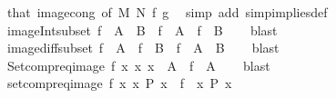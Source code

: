 \begin{isabellebody}
\ that\ image{\isacharunderscore}{\kern0pt}cong\ {\isacharbrackleft}{\kern0pt}of\ M\ N\ f\ g{\isacharbrackright}{\kern0pt}\ \isamarkupfalse%
\ {\isacharparenleft}{\kern0pt}simp\ add{\isacharcolon}{\kern0pt}\ simp{\isacharunderscore}{\kern0pt}implies{\isacharunderscore}{\kern0pt}def{\isacharparenright}{\kern0pt}%
\endisatagproof
{\isafoldproof}%
%
\isadelimproof
\isanewline
%
\endisadelimproof
\isanewline
{}\isamarkupfalse%
\ image{\isacharunderscore}{\kern0pt}Int{\isacharunderscore}{\kern0pt}subset{\isacharcolon}{\kern0pt}\ {\isachardoublequoteopen}f\ {\isacharbackquote}{\kern0pt}\ {\isacharparenleft}{\kern0pt}A\ {\isasyminter}\ B{\isacharparenright}{\kern0pt}\ {\isasymsubseteq}\ f\ {\isacharbackquote}{\kern0pt}\ A\ {\isasyminter}\ f\ {\isacharbackquote}{\kern0pt}\ B{\isachardoublequoteclose}\isanewline
%
\isadelimproof
\ \ %
\endisadelimproof
%
\isatagproof
{}\isamarkupfalse%
\ blast%
\endisatagproof
{\isafoldproof}%
%
\isadelimproof
\isanewline
%
\endisadelimproof
\isanewline
{}\isamarkupfalse%
\ image{\isacharunderscore}{\kern0pt}diff{\isacharunderscore}{\kern0pt}subset{\isacharcolon}{\kern0pt}\ {\isachardoublequoteopen}f\ {\isacharbackquote}{\kern0pt}\ A\ {\isacharminus}{\kern0pt}\ f\ {\isacharbackquote}{\kern0pt}\ B\ {\isasymsubseteq}\ f\ {\isacharbackquote}{\kern0pt}\ {\isacharparenleft}{\kern0pt}A\ {\isacharminus}{\kern0pt}\ B{\isacharparenright}{\kern0pt}{\isachardoublequoteclose}\isanewline
%
\isadelimproof
\ \ %
\endisadelimproof
%
\isatagproof
{}\isamarkupfalse%
\ blast%
\endisatagproof
{\isafoldproof}%
%
\isadelimproof
\isanewline
%
\endisadelimproof
\isanewline
{}\isamarkupfalse%
\ Setcompr{\isacharunderscore}{\kern0pt}eq{\isacharunderscore}{\kern0pt}image{\isacharcolon}{\kern0pt}\ {\isachardoublequoteopen}{\isacharbraceleft}{\kern0pt}f\ x\ {\isacharbar}{\kern0pt}x{\isachardot}{\kern0pt}\ x\ {\isasymin}\ A{\isacharbraceright}{\kern0pt}\ {\isacharequal}{\kern0pt}\ f\ {\isacharbackquote}{\kern0pt}\ A{\isachardoublequoteclose}\isanewline
%
\isadelimproof
\ \ %
\endisadelimproof
%
\isatagproof
{}\isamarkupfalse%
\ blast%
\endisatagproof
{\isafoldproof}%
%
\isadelimproof
\isanewline
%
\endisadelimproof
\isanewline
{}\isamarkupfalse%
\ setcompr{\isacharunderscore}{\kern0pt}eq{\isacharunderscore}{\kern0pt}image{\isacharcolon}{\kern0pt}\ {\isachardoublequoteopen}{\isacharbraceleft}{\kern0pt}f\ x\ {\isacharbar}{\kern0pt}x{\isachardot}{\kern0pt}\ P\ x{\isacharbraceright}{\kern0pt}\ {\isacharequal}{\kern0pt}\ f\ {\isacharbackquote}{\kern0pt}\ {\isacharbraceleft}{\kern0pt}x{\isachardot}{\kern0pt}\ P\ x{\isacharbraceright}{\kern0pt}{\isachardoublequoteclose}\isanewline

\end{isabellebody}
